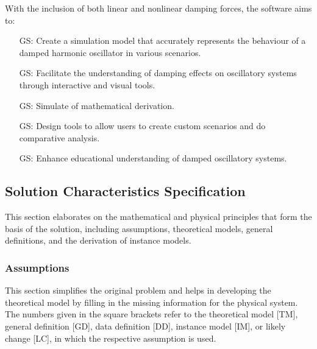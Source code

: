 \documentclass[12pt]{article}
\newcounter{goalnum} %
\begin{document}
With the inclusion of both linear and nonlinear damping forces, the software aims 
to:

\begin{itemize}

  \item[GS\refstepcounter{goalnum}\thegoalnum \label{GS1}:] Create a simulation model that accurately represents the 
  behaviour of a damped harmonic oscillator in various scenarios.
  \item[GS\refstepcounter{goalnum}\thegoalnum \label{GS2}:] Facilitate the understanding of damping effects on 
  oscillatory systems through interactive and visual tools.
  \item[GS\refstepcounter{goalnum}\thegoalnum \label{GS3}:] Simulate of mathematical derivation.
  \item[GS\refstepcounter{goalnum}\thegoalnum \label{GS4}:] Design tools to allow users to create custom scenarios and 
  do comparative analysis. 
  \item[GS\refstepcounter{goalnum}\thegoalnum \label{GS5}:] Enhance educational understanding of damped oscillatory 
  systems.
  
\end{itemize}

\subsection{Solution Characteristics Specification}

This section elaborates on the mathematical and physical principles that form 
the basis of the solution, including assumptions, theoretical models, general 
definitions, and the derivation of instance models.

\subsubsection{Assumptions} \label{sec_assumpt}

This section simplifies the original problem and helps in developing the
theoretical model by filling in the missing information for the physical system.
The numbers given in the square brackets refer to the theoretical model [TM],
general definition [GD], data definition [DD], instance model [IM], or likely
change [LC], in which the respective assumption is used.
\end{document}
